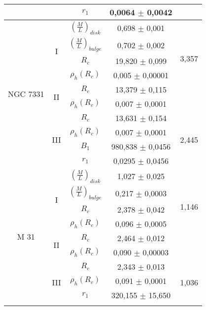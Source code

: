 \begin{center}
\begin{longtable}[t]{ccccc}
& & $r_{1}$ & 0,0064 $\pm$ 0,0042 \\ \hline
\multirow{10}{*}{NGC 7331} & \multirow{4}{*}{I} & $(\frac{M}{L})_{disk}$ & 0,698 $\pm$ 0,001 & \multirow{5}{*}{3,357} &\\
& & $(\frac{M}{L})_{bulge}$ & 0,702 $\pm$ 0,002 \\
& & $R_{c}$ & 19,820 $\pm$ 0,099 \\
& & $\rho_{h}(R_{c})$ & 0,005 $\pm$ 0,00001 \\ \cline{2-5}
& \multirow{2}{*}{II} & $R_{c}$ & 13,379 $\pm$ 0,115 & \multirow{2}{*}{2,532} &\\
& & $\rho_{h}(R_{c})$ & 0,007 $\pm$ 0,0001 \\ \cline{2-5}
& \multirow{4}{*}{III} & $R_{c}$ & 13,631 $\pm$ 0,154 & \multirow{4}{*}{2,445} &\\
& & $\rho_{h}(R_{c})$ & 0,007 $\pm$ 0,0001 \\
& & $B_{1}$ & 980,838 $\pm$ 0,0456 \\
& & $r_{1}$ & 0,0295 $\pm$ 0,0456 \\ \hline
\multirow{10}{*}{M 31} & \multirow{4}{*}{I} & $(\frac{M}{L})_{disk}$ & 1,027 $\pm$ 0,025 & \multirow{5}{*}{1,146} &\\
& & $(\frac{M}{L})_{bulge}$ & 0,217 $\pm$ 0,0003 \\
& & $R_{c}$ & 2,378 $\pm$ 0,042 \\
& & $\rho_{h}(R_{c})$ & 0,096 $\pm$ 0,0005 \\ \cline{2-5}
& \multirow{2}{*}{II} & $R_{c}$ & 2,464 $\pm$ 0,012 & \multirow{2}{*}{1,148} &\\
& & $\rho_{h}(R_{c})$ & 0,090 $\pm$ 0,00003 \\ \cline{2-5}
& \multirow{4}{*}{III} & $R_{c}$ & 2,343 $\pm$ 0,013 & \multirow{4}{*}{1,036} &\\
& & $\rho_{h}(R_{c})$ & 0,091 $\pm$ 0,0001 \\
& & $r_{1}$ & 320,155 $\pm$ 15,650 \\ 
\hline
\label{table:fit}
\end{longtable}
\end{center}